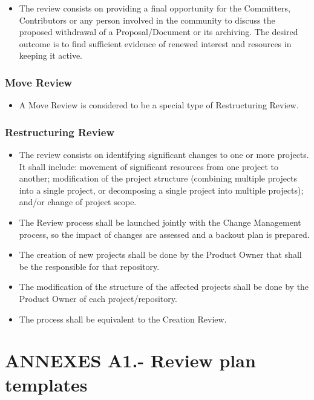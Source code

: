 \documentclass{template/openetcs_article}
\begin{document}
\begin{itemize}
\item The review consists on providing a final opportunity for the Committers, Contributors or any person involved in the community to discuss the proposed withdrawal of a Proposal/Document or its archiving. The desired outcome is to find sufficient evidence of renewed interest and resources in keeping it active.
\end{itemize}

\subsubsection{Move Review}

\begin{itemize}
\item A Move Review is considered to be a special type of Restructuring Review.
\end{itemize}

\subsubsection{Restructuring Review}

\begin{itemize}
\item The review consists on identifying significant changes to one or more projects. It shall include: movement of significant resources from one project to another; modification of the project structure (combining multiple projects into a single project, or decomposing a single project into multiple projects); and/or change of project scope.
\item The Review process shall be launched jointly with the Change Management process, so the impact of changes are assessed and a backout plan is prepared.
\item The creation of new projects shall be done by the Product Owner that shall be the responsible for that repository.
\item The modification of the structure of the affected projects shall be done by the Product Owner of each project/repository.
\item The process shall be equivalent to the Creation Review. 
\end{itemize}

\section{ANNEXES A1.- Review plan templates}
\end{document}

